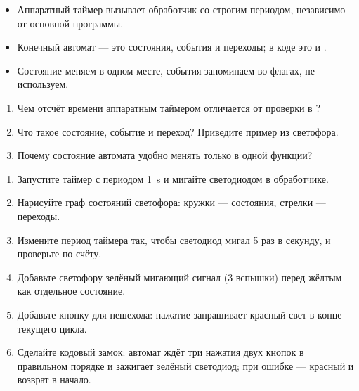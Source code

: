 \begin{summary}
\begin{itemize}[leftmargin=*]
  \item Аппаратный таймер вызывает обработчик со строгим периодом, независимо от основной программы.
  \item Конечный автомат --- это состояния, события и переходы; в коде это  и .
  \item Состояние меняем в одном месте, события запоминаем во флагах,  не используем.
\end{itemize}
\end{summary}

\begin{selfcheck}
\begin{enumerate}
  \item Чем отсчёт времени аппаратным таймером отличается от проверки  в ?
  \item Что такое состояние, событие и переход? Приведите пример из светофора.
  \item Почему состояние автомата удобно менять только в одной функции?
\end{enumerate}
\end{selfcheck}

\begin{tasks}
\begin{enumerate}
\item {} Запустите таймер с периодом \SI{1}{s} и мигайте светодиодом в обработчике.
\item {} Нарисуйте граф состояний светофора: кружки --- состояния, стрелки --- переходы.
\item {} Измените период таймера так, чтобы светодиод мигал 5 раз в секунду, и проверьте по счёту.
\item {} Добавьте светофору зелёный мигающий сигнал (3 вспышки) перед жёлтым как отдельное состояние.
\item {} Добавьте кнопку для пешехода: нажатие запрашивает красный свет в конце текущего цикла.
\item {} Сделайте кодовый замок: автомат ждёт три нажатия двух кнопок в правильном порядке и зажигает зелёный светодиод; при ошибке --- красный и возврат в начало.
\end{enumerate}
\end{tasks}
